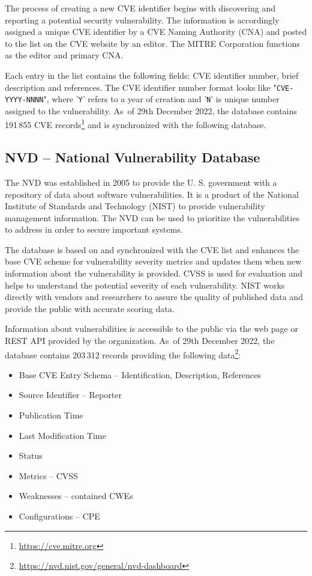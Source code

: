     The process of creating a new CVE identifier begins with discovering and reporting a potential security
    vulnerability. The information is accordingly assigned a unique CVE identifier by a CVE Naming Authority
    (CNA) and posted to the list on the CVE website by an editor. The MITRE Corporation functions as the editor
    and primary CNA. \cite{CVE}

    Each entry in the list contains the following fields: CVE identifier number, brief description and references.
    The CVE identifier number format looks like "\texttt{CVE-YYYY-NNNN}", where
    '\texttt{Y}' refers to a year of creation and '\texttt{N}' is unique number assigned to the vulnerability.
    As~of 29th December 2022, the database contains 191\,855 CVE records\footnote{\href{https://cve.mitre.org}
    {https://cve.mitre.org}} and is synchronized with the following database.

  \subsection*{NVD -- National Vulnerability Database}
  The NVD was established in 2005 to provide the U. S. government with a repository of data about software
  vulnerabilities. It is a product of the National Institute of Standards and Technology (NIST) to provide
  vulnerability management information. The NVD can be used to prioritize the vulnerabilities to address
  in order to secure important systems.

  The database is based on and synchronized with the CVE list and enhances the base CVE scheme for vulnerability
  severity metrics and updates them when new information about the vulnerability is provided. CVSS is used
  for evaluation and helps to understand the potential severity of each vulnerability. NIST works directly
  with vendors and researchers to assure the quality of published data and provide the public with accurate
  scoring data. \cite{NVD}

  Information about vulnerabilities is accessible to the public via the web page or REST API provided
  by the organization. As~of 29th December 2022, the database contains 203\,312 records providing the following
  data\footnote{\href{https://nvd.nist.gov/general/nvd-dashboard}{https://nvd.nist.gov/general/nvd-dashboard}}:
  \begin{itemize}
      \item Base CVE Entry Schema -- Identification, Description, References
      \item Source Identifier -- Reporter
      \item Publication Time
      \item Last Modification Time
      \item Status
      \item Metrics -- CVSS
      \item Weaknesses -- contained CWEs
      \item Configurations -- CPE
  \end{itemize}


